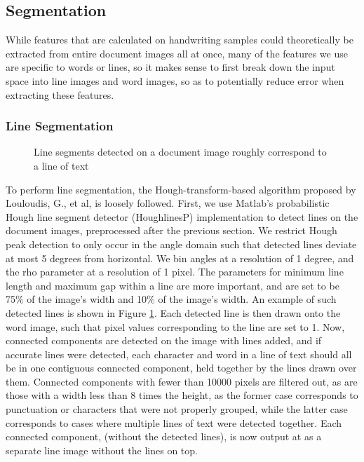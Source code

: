 \documentclass[paper=a4, fontsize=11pt]{scrartcl} %
\numberwithin{equation}{section} %
\numberwithin{figure}{section} %
\numberwithin{table}{section} %
\begin{document}
\subsection{Segmentation}
While features that are calculated on handwriting samples could
theoretically be extracted from entire document images all at once,
many of the features we use are specific to words or lines, so it
makes sense to first break down the input space into line images and
word images, so as to potentially reduce error when extracting these
features.

\subsubsection{Line Segmentation}

\begin{figure}
  \caption{Line segments detected on a document image roughly
    correspond to a line of text}
\label{fig:houghLineDetect}
\end{figure}

To perform line segmentation, the Hough-transform-based algorithm
proposed by Louloudis, G., et al, \cite{BlockBased} is loosely
followed. First, we use Matlab's probabilistic Hough line segment
detector (HoughlinesP) implementation to detect lines on the document
images, preprocessed after the previous section. We restrict Hough
peak detection to only occur in the angle domain such that detected
lines deviate at most 5 degrees from horizontal. We bin angles at a
resolution of 1 degree, and the rho parameter at a resolution of 1
pixel. The parameters for minimum line length and maximum gap within a
line are more important, and are set to be 75\% of the image's width
and 10\% of the image's width. An example of such detected lines is
shown in Figure \ref{fig:houghLineDetect}. Each detected line is then
drawn onto the word image, such that pixel values corresponding to the
line are set to 1. Now, connected components are detected on the image
with lines added, and if accurate lines were detected, each character
and word in a line of text should all be in one contiguous connected
component, held together by the lines drawn over them. Connected
components with fewer than 10000 pixels are filtered out, as are those
with a width less than 8 times the height, as the former case
corresponds to punctuation or characters that were not properly
grouped, while the latter case corresponds to cases where multiple
lines of text were detected together. Each connected component,
(without the detected lines), is now output at as a separate line
image without the lines on top. 
\end{document}
